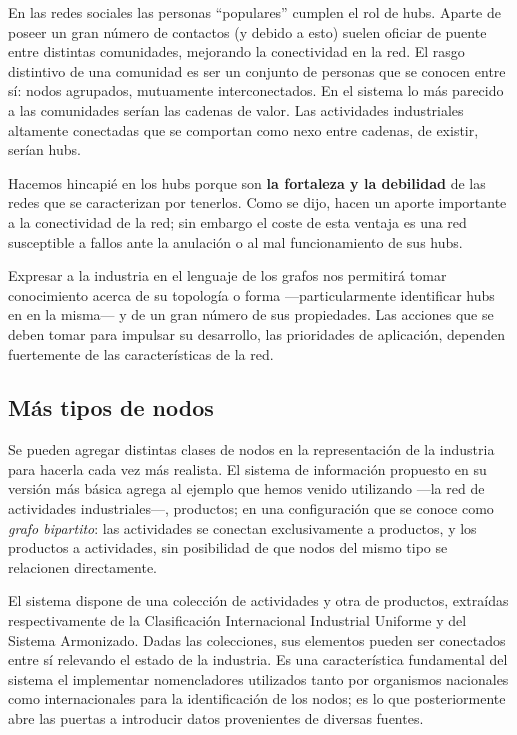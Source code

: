 \documentclass[a4paper]{report}
\begin{document}
En las redes sociales las personas ``populares'' cumplen el rol de hubs. Aparte de poseer un gran número de contactos (y debido a esto) suelen oficiar de puente entre distintas comunidades, mejorando la conectividad en la red.  El rasgo distintivo de una comunidad es ser un conjunto de personas que se conocen entre sí: nodos agrupados, mutuamente interconectados. En el sistema lo más parecido a las comunidades serían las cadenas de valor. Las actividades industriales altamente conectadas que se comportan como nexo entre cadenas, de existir, serían hubs. 

Hacemos hincapié en los hubs porque son \textbf{la fortaleza y la debilidad} de las redes que se caracterizan por tenerlos. Como se dijo, hacen un aporte importante a la conectividad de la red; sin embargo el coste de esta ventaja es una red susceptible a fallos ante la anulación o al mal funcionamiento de sus hubs.

Expresar a la industria en el lenguaje de los grafos nos permitirá tomar conocimiento acerca de su topología o forma —particularmente identificar hubs en en la misma— y de un gran número de sus propiedades. Las acciones que se deben tomar para impulsar su desarrollo, las prioridades de aplicación, dependen fuertemente de las características de la red. 

\subsection*{Más tipos de nodos}

Se pueden agregar distintas clases de nodos en la representación de la industria para hacerla cada vez más realista. El sistema de información propuesto en su versión más básica agrega al ejemplo que hemos venido utilizando —la red de actividades industriales—, productos; en una configuración que se conoce como \textit{grafo bipartito}: las actividades se conectan exclusivamente a productos, y los productos a actividades, sin posibilidad de que nodos del mismo tipo se relacionen directamente.

El sistema dispone de una colección de actividades y otra de productos, extraídas respectivamente de la Clasificación Internacional Industrial Uniforme y del Sistema Armonizado. Dadas las colecciones, sus elementos pueden ser conectados entre sí relevando el estado de la industria. Es una característica fundamental del sistema el implementar nomencladores utilizados tanto por organismos nacionales como internacionales para la identificación de los nodos; es lo que posteriormente abre las puertas a introducir datos provenientes de diversas fuentes.
\end{document}
